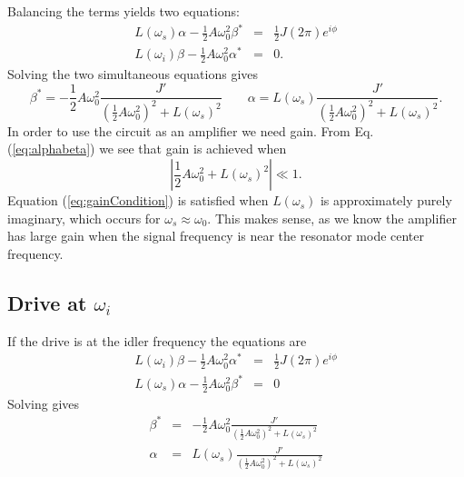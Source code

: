 \documentclass{article}
\begin{document}
Balancing the terms yields two equations: \begin{eqnarray}
L(\omega_s)\alpha - \frac{1}{2}A\omega_0^2 \beta^* &=& \frac{1}{2}J(2\pi)e^{i\phi} \\
L(\omega_i)\beta - \frac{1}{2}A\omega_0^2 \alpha^* &=& 0 . \end{eqnarray}
Solving the two simultaneous equations gives
\begin{equation}
\beta^* = - \frac{1}{2}A\omega_0^2 \frac{J'}{\left(\frac{1}{2}A\omega_0^2 \right)^2 + L(\omega_s)^2} \qquad
\alpha = L(\omega_s) \frac{J'}{\left(\frac{1}{2}A\omega_0^2 \right)^2 + L(\omega_s)^2} . \label{eq:alphabeta}
\end{equation}
In order to use the circuit as an amplifier we need gain.
From Eq. (\ref{eq:alphabeta}) we see that gain is achieved when
\begin{equation}
\left| \frac{1}{2}A\omega_0^2 + L(\omega_s)^2 \right| \ll 1 . \label{eq:gainCondition} \end{equation}
Equation (\ref{eq:gainCondition}) is satisfied when $L(\omega_s)$ is approximately purely imaginary, which occurs for $\omega_s \approx \omega_0$.
This makes sense, as we know the amplifier has large gain when the signal frequency is near the resonator mode center frequency.

\subsection{Drive at $\omega_i$}
If the drive is at the idler frequency the equations are \begin{eqnarray}
L(\omega_i)\beta - \frac{1}{2}A\omega_0^2 \alpha^* &=& \frac{1}{2}J(2\pi)e^{i\phi} \\
L(\omega_s)\alpha - \frac{1}{2}A\omega_0^2 \beta^* &=& 0 \end{eqnarray}
Solving gives \begin{eqnarray}
\beta^* &=& -\frac{1}{2}A\omega_0^2 \frac{J'}{\left( \frac{1}{2}A\omega_0^2 \right)^2 + L(\omega_s)^2} \\
\alpha &=& L(\omega_s) \frac{J'}{\left( \frac{1}{2}A\omega_0^2 \right)^2 + L(\omega_s)^2} \end{eqnarray}
\end{document}

